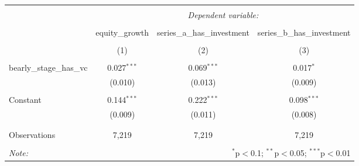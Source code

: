 
\begin{tabular}{@{\extracolsep{5pt}}lccc} 
\\[-1.8ex]\hline 
\hline \\[-1.8ex] 
 & \multicolumn{3}{c}{\textit{Dependent variable:}} \\ 
\cline{2-4} 
\\[-1.8ex] & equity\_growth & series\_a\_has\_investment & series\_b\_has\_investment \\ 
\\[-1.8ex] & (1) & (2) & (3)\\ 
\hline \\[-1.8ex] 
 bearly\_stage\_has\_vc & 0.027$^{***}$ & 0.069$^{***}$ & 0.017$^{*}$ \\ 
  & (0.010) & (0.013) & (0.009) \\ 
  & & & \\ 
 Constant & 0.144$^{***}$ & 0.222$^{***}$ & 0.098$^{***}$ \\ 
  & (0.009) & (0.011) & (0.008) \\ 
  & & & \\ 
\hline \\[-1.8ex] 
Observations & 7,219 & 7,219 & 7,219 \\ 
\hline 
\hline \\[-1.8ex] 
\textit{Note:}  & \multicolumn{3}{r}{$^{*}$p$<$0.1; $^{**}$p$<$0.05; $^{***}$p$<$0.01} \\ 
\end{tabular} 

